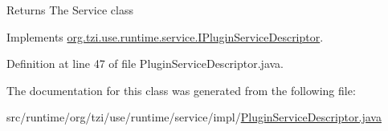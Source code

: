 \begin{DoxyReturn}{Returns}
The Service class 
\end{DoxyReturn}


Implements \hyperlink{interfaceorg_1_1tzi_1_1use_1_1runtime_1_1service_1_1_i_plugin_service_descriptor_ad584331e0520e4b797ccb290ce267c74}{org.\-tzi.\-use.\-runtime.\-service.\-I\-Plugin\-Service\-Descriptor}.



Definition at line 47 of file Plugin\-Service\-Descriptor.\-java.



The documentation for this class was generated from the following file\-:\begin{DoxyCompactItemize}
\item 
src/runtime/org/tzi/use/runtime/service/impl/\hyperlink{_plugin_service_descriptor_8java}{Plugin\-Service\-Descriptor.\-java}\end{DoxyCompactItemize}
